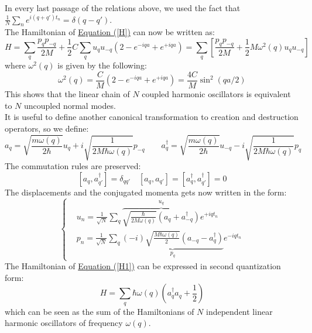 \documentclass[10.75pt,a4paper,openright,bottom=2cm]{article}
\begin{document}
In every last passage of the relations above, we used the fact that $\frac{1}{N}\sum_ne^{i(q+q')t_n}=\delta(q-q')$.\\
The Hamiltonian of \hyperref[H]{Equation (\ref{H})} can now be written as:
\begin{equation}
\label{H1}
H=\sum_q\frac{p_qp_{-q}}{2M}+\frac{1}{2}C\sum_qu_qu_{-q}(2-e^{-iqa}+e^{+iqa})=\sum_q\left[\frac{p_qp_{-q}}{2M}+\frac{1}{2}M\omega^2(q)u_qu_{-q}\right]
\end{equation}
where $\omega^2(q)$ is given by the following:
\[
\omega^2(q)=\frac{C}{M}(2-e^{-iqa}+e^{+iqa})=\frac{4C}{M}\sin^2(qa/2)
\]
This shows that the linear chain of $N$ coupled harmonic oscillators is equivalent to $N$ uncoupled normal modes.\\
It is useful to define another canonical transformation to creation and destruction operators, so we define:
\[
a_q=\sqrt{\frac{m\omega(q)}{2\hbar}}u_q+i\sqrt{\frac{1}{2M\hbar\omega(q)}}p_{-q} \qquad a_q^\dagger=\sqrt{\frac{m\omega(q)}{2\hbar}}u_{-q}-i\sqrt{\frac{1}{2M\hbar\omega(q)}}p_q
\]
The commutation rules are preserved:
\[
[a_q,a_{q'}^\dagger]=\delta_{qq'} \quad [a_q,a_{q'}]=[a_q^\dagger,a_{q'}^\dagger]=0
\]
The displacements and the conjugated momenta gets now written in the form:
\[
\left\{
\begin{aligned}
&u_n=\frac{1}{\sqrt{N}}\sum_q\overbrace{\sqrt{\frac{\hbar}{2M\omega(q)}}(a_q+a_{-q}^\dagger)}^{u_q}e^{+iqt_n}\\
&p_n=\frac{1}{\sqrt{N}}\sum_q\underbrace{(-i)\sqrt{\frac{M\hbar\omega(q)}{2}}(a_{-q}-a_q^\dagger)}_{p_q}e^{-iqt_n}
\end{aligned}
\right.
\]
The Hamiltonian of \hyperref[H1]{Equation (\ref{H1})} can be expressed in second quantization form:
\[
H=\sum_q\hbar\omega(q)\left(a_q^\dagger a_q+\frac{1}{2}\right)
\]
which can be seen as the sum of the Hamiltonians of $N$ independent linear harmonic oscillators of frequency $\omega(q)$.
\end{document}
